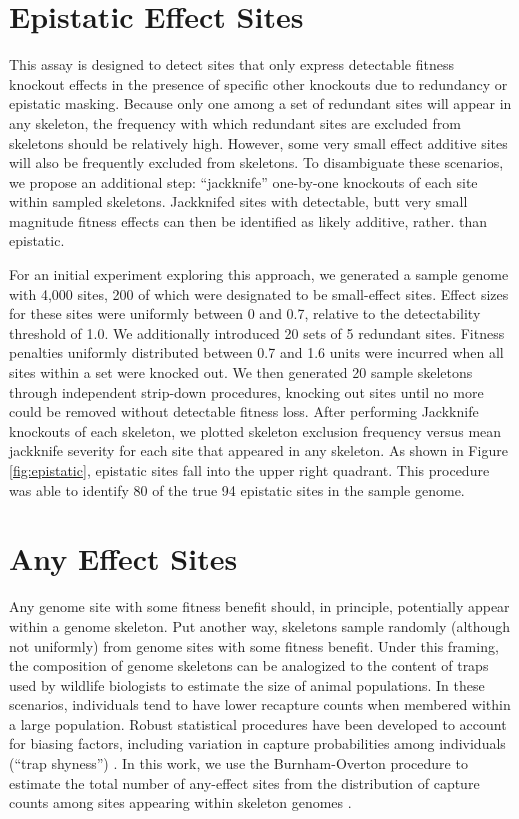 \section{Epistatic Effect Sites}



This assay is designed to detect sites that only express detectable fitness knockout effects in the presence of specific other knockouts due to redundancy or epistatic masking.
Because only one among a set of redundant sites will appear in any skeleton, the frequency with which redundant sites are excluded from skeletons should be relatively high.
However, some very small effect additive sites will also be frequently excluded from skeletons.
To disambiguate these scenarios, we propose an additional step: ``jackknife'' one-by-one knockouts of each site within sampled skeletons.
Jackknifed sites with detectable, butt very small magnitude fitness effects can then be identified as likely additive,  rather. than epistatic.

For an initial experiment exploring this approach, we generated a sample genome with 4,000 sites, 200 of which were designated to be small-effect sites.
Effect sizes for these sites were uniformly between 0 and 0.7, relative to the detectability threshold of 1.0.
We additionally introduced 20 sets of 5 redundant sites.
Fitness penalties uniformly distributed between 0.7 and 1.6 units were incurred when all sites within a set were knocked out.
We then generated 20 sample skeletons through independent strip-down procedures, knocking out sites until no more could be removed without detectable fitness loss.
After performing Jackknife knockouts of each skeleton, we plotted skeleton exclusion frequency versus mean jackknife severity for each site that appeared in any skeleton.
As shown in Figure \ref{fig:epistatic}, epistatic sites fall into the upper right quadrant.
This procedure was able to identify 80 of the true 94 epistatic sites in the sample genome.

\section{Any Effect Sites}

Any genome site with some fitness benefit should, in principle, potentially appear within a genome skeleton.
Put another way, skeletons sample randomly (although not uniformly) from genome sites with some fitness benefit.
Under this framing, the composition of genome skeletons can be analogized to the content of traps used by wildlife biologists to estimate the size of animal populations.
In these scenarios, individuals tend to have lower recapture counts when membered within a large population.
Robust statistical procedures have been developed to account for biasing factors, including variation in capture probabilities among individuals (``trap shyness'') \citep{amstrup2010handbook}.
In this work, we use the Burnham-Overton procedure to estimate the total number of any-effect sites from the distribution of capture counts among sites appearing within skeleton genomes \citep{burnham1979robust}.


